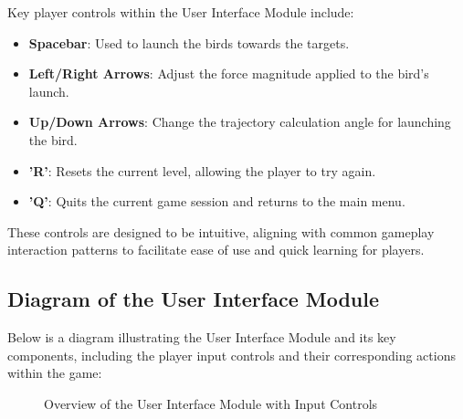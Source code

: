 \documentclass[12pt]{article}
\begin{document}
Key player controls within the User Interface Module include:
\begin{itemize}
    \item \textbf{Spacebar}: Used to launch the birds towards the targets.
    \item \textbf{Left/Right Arrows}: Adjust the force magnitude applied to the bird's launch.
    \item \textbf{Up/Down Arrows}: Change the trajectory calculation angle for launching the bird.
    \item \textbf{'R'}: Resets the current level, allowing the player to try again.
    \item \textbf{'Q'}: Quits the current game session and returns to the main menu.
\end{itemize}

These controls are designed to be intuitive, aligning with common gameplay interaction patterns to facilitate ease of use and quick learning for players.

\subsection{Diagram of the User Interface Module}
Below is a diagram illustrating the User Interface Module and its key components, including the player input controls and their corresponding actions within the game:

\begin{figure}[H]
\centering
{}
\caption{Overview of the User Interface Module with Input Controls}
\label{fig:user-interface-module}
\end{figure}
\end{document}

